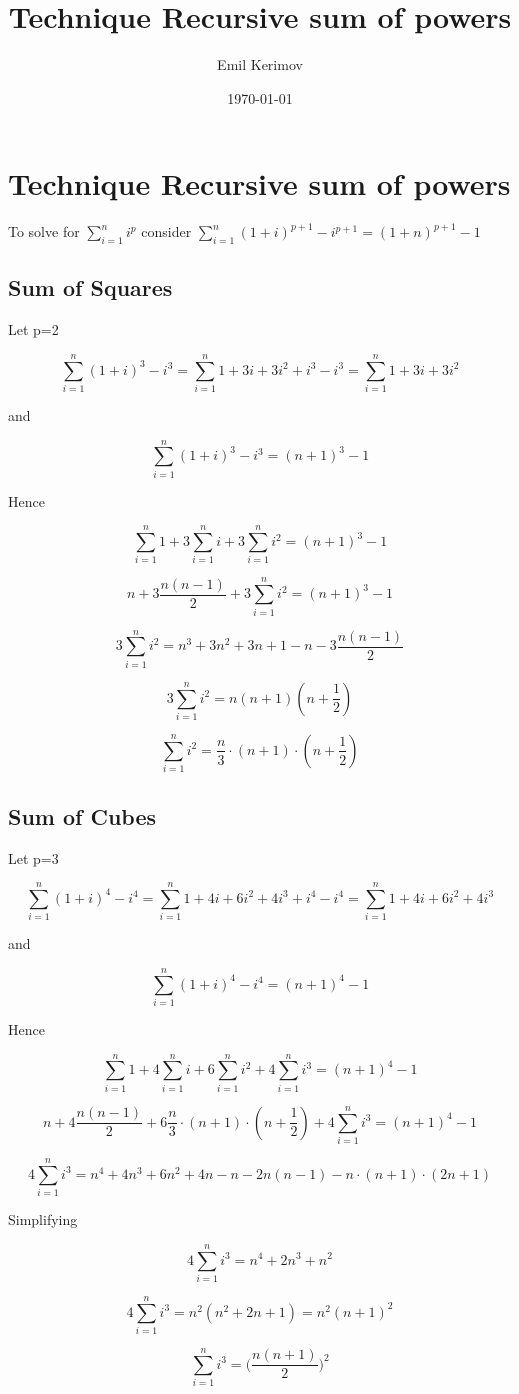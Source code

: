 \documentclass[a4paper]{article}
\title{Technique Recursive sum of powers}
\author{Emil Kerimov}
\date{\today}
\begin{document}
\maketitle

\section{Technique Recursive sum of powers}
\label{Recursive sum of powers}

To solve for $\sum\limits_{i=1}^{n} i^{p}$ consider $\sum\limits_{i=1}^{n} {(1+i)^{p+1} - i^{p+1}} = (1+n)^{p+1} - 1$

\subsection{Sum of Squares}

Let p=2

$$\sum\limits_{i=1}^{n} (1+i)^3 - i^3 = \sum\limits_{i=1}^{n} 1+3i+3i^2 +i^3 - i^3 = \sum\limits_{i=1}^{n} 1+3i+3i^2$$

and 

$$\sum\limits_{i=1}^{n} (1+i)^3 - i^3 = (n+1)^3 - 1$$

Hence

$$\sum\limits_{i=1}^{n} 1+ 3\sum\limits_{i=1}^{n}i+3\sum\limits_{i=1}^{n}i^2 =(n+1)^3 - 1$$

$$n+3\frac{n(n-1)}{2}+3\sum\limits_{i=1}^{n}i^2 =(n+1)^3 - 1$$


$$3\sum\limits_{i=1}^{n}i^2 = n^3 + 3n^2 + 3n + 1 - n - 3\frac{n(n-1)}{2}$$


$$3\sum\limits_{i=1}^{n}i^2 = n(n+1)(n+\frac{1}{2})$$


$$
\boxed{
\sum\limits_{i=1}^{n}i^2 = \frac{n}{3} \cdot (n+1) \cdot (n+\frac{1}{2})
}
$$

\subsection{Sum of Cubes}

Let p=3

$$\sum\limits_{i=1}^{n} (1+i)^4 - i^4 = \sum\limits_{i=1}^{n} 1+4i+6i^2 + 4i^3 +i^4 - i^4 = \sum\limits_{i=1}^{n} 1+4i+6i^2 + 4i^3$$

and 

$$\sum\limits_{i=1}^{n} (1+i)^4 - i^4 = (n+1)^4 - 1$$

Hence

$$\sum\limits_{i=1}^{n} 1+ 4\sum\limits_{i=1}^{n}i + 6\sum\limits_{i=1}^{n}i^2
+ 4\sum\limits_{i=1}^{n}i^3 =(n+1)^4 - 1$$

$$n+4\frac{n(n-1)}{2}+6 \frac{n}{3} \cdot (n+1) \cdot (n+\frac{1}{2}) + 4\sum\limits_{i=1}^{n}i^3 =(n+1)^4 - 1$$


$$4\sum\limits_{i=1}^{n}i^3 = n^4 + 4n^3 + 6n^2 + 4n - n - 2n(n-1) - n\cdot (n+1) \cdot (2n+1)$$

Simplifying

$$4\sum\limits_{i=1}^{n}i^3 = n^4 + 2n^3 + n^2 $$

$$4\sum\limits_{i=1}^{n}i^3 = n^2 (n^2 + 2n + 1) = n^2(n+1)^2$$

$$
\boxed{
\sum\limits_{i=1}^{n}i^3 = \Big( \frac{n(n+1)}{2} \Big)^2
}
$$
\end{document}
